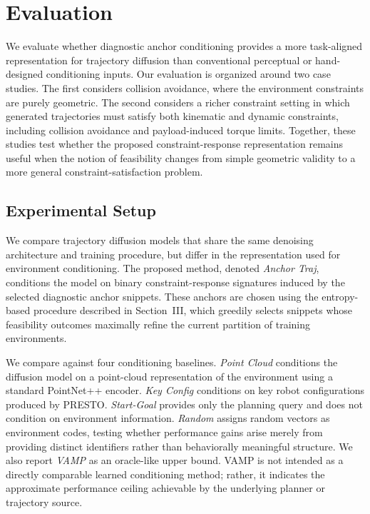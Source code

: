 \section{Evaluation}\label{sec:evaluation}

We evaluate whether diagnostic anchor conditioning provides a more task-aligned representation for trajectory diffusion than conventional perceptual or hand-designed conditioning inputs. Our evaluation is organized around two case studies. The first considers collision avoidance, where the environment constraints are purely geometric. The second considers a richer constraint setting in which generated trajectories must satisfy both kinematic and dynamic constraints, including collision avoidance and payload-induced torque limits. Together, these studies test whether the proposed constraint-response representation remains useful when the notion of feasibility changes from simple geometric validity to a more general constraint-satisfaction problem.

\subsection{Experimental Setup}

We compare trajectory diffusion models that share the same denoising architecture and training procedure, but differ in the representation used for environment conditioning. The proposed method, denoted \textit{Anchor Traj}, conditions the model on binary constraint-response signatures induced by the selected diagnostic anchor snippets. These anchors are chosen using the entropy-based procedure described in Section~III, which greedily selects snippets whose feasibility outcomes maximally refine the current partition of training environments.

We compare against four conditioning baselines. \textit{Point Cloud} conditions the diffusion model on a point-cloud representation of the environment using a standard PointNet++ encoder. \textit{Key Config} conditions on key robot configurations produced by PRESTO. \textit{Start-Goal} provides only the planning query and does not condition on environment information. \textit{Random} assigns random vectors as environment codes, testing whether performance gains arise merely from providing distinct identifiers rather than behaviorally meaningful structure. We also report \textit{VAMP} as an oracle-like upper bound. VAMP is not intended as a directly comparable learned conditioning method; rather, it indicates the approximate performance ceiling achievable by the underlying planner or trajectory source.


